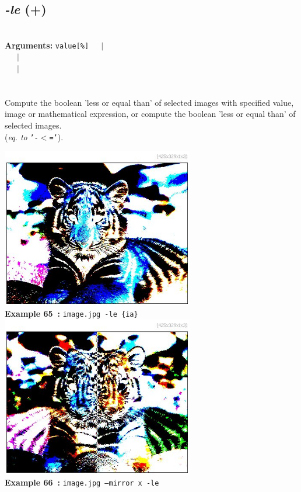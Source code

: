 \documentclass[a4paper,11pt,twoside]{book}
\begin{document}
\subsection{\emph{-le} (+)}\vspace*{-0.5em}
~\\\textbf{Arguments: } 
{\small \texttt{value[\%]}}~~~$|$\\
\hspace*{2.2cm}{\small \texttt{[image]}}~~~$|$\\
~~~$|$\\
\\~\\
Compute the boolean 'less or equal than' of selected images with specified value, image or
mathematical expression, or compute the boolean 'less or equal than' of selected images.
~\\(\emph{eq. to} {\small \texttt{'-$<$='}}).
\begin{center}\includegraphics[keepaspectratio=true,height=7cm,width=\textwidth]{img/gmic_def65.jpg}\\
{\footnotesize \textbf{Example 65~:} \texttt{image.jpg -le \{ia\}}}
\\\includegraphics[keepaspectratio=true,height=7cm,width=\textwidth]{img/gmic_def66.jpg}\\
{\footnotesize \textbf{Example 66~:} \texttt{image.jpg --mirror x -le}}
\end{center}
\end{document}
